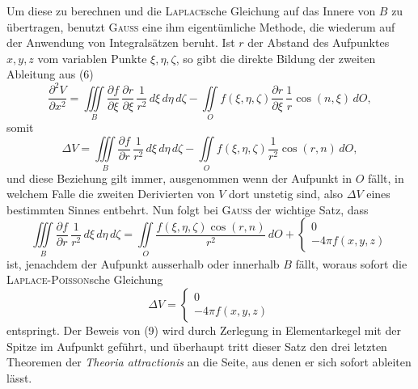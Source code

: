Um diese zu berechnen und die \textsc{Laplace}sche Gleichung auf das Innere
von \(B\) zu übertragen, benutzt \textsc{Gauss} eine ihm eigentümliche Methode, die
wiederum auf der Anwendung von Integralsätzen beruht. Ist \(r\) der Abstand
des Aufpunktes \(x,y,z\) vom variablen Punkte \(\xi,\eta,\zeta\), so gibt die direkte Bildung
der zweiten Ableitung aus (6)
\begingroup\small
\[
\frac{\partial^2V}{\partial x^2}
=\iiint\limits_B\frac{\partial f}{\partial\xi}\,\frac{\partial r}{\partial\xi}\,\frac1{r^2}\,d\xi\,d\eta\,d\zeta
-\iint\limits_O f(\xi,\eta,\zeta)\frac{\partial r}{\partial\xi}\,\frac1r\cos(n,\xi)\,dO,\tag{7}
\]
\endgroup
\noindent somit
\[
\Delta V=\iiint\limits_B\frac{\partial f}{\partial r}\,\frac1{r^2}\,d\xi\,d\eta\,d\zeta
-\iint\limits_O f(\xi,\eta,\zeta)\frac1{r^2}\cos(r,n)\,dO,\tag{8}
\]
\noindent und diese Beziehung gilt immer, ausgenommen wenn der Aufpunkt in \(O\) fällt,
in welchem Falle die zweiten Derivierten von \(V\) dort unstetig sind, also \(\Delta V\)
eines bestimmten Sinnes entbehrt. Nun folgt bei \textsc{Gauss} der wichtige Satz,
dass
\begingroup\small
\[
\iiint\limits_B\frac{\partial f}{\partial r}\,\frac1{r^2}\,d\xi\,d\eta\,d\zeta
=\iint\limits_O\frac{f(\xi,\eta,\zeta)\cos(r,n)}{r^2}\,dO
+\left\{\begin{array}{l}0\\-4\pi f(x,y,z)\end{array}\right.\tag{9}
\]
\endgroup
\noindent ist, jenachdem der Aufpunkt ausserhalb oder innerhalb \(B\) fällt, woraus sofort
die \textsc{Laplace-Poisson}sche Gleichung
\[
\Delta V=\left\{\begin{array}{l}0\\-4\pi f(x,y,z)\end{array}\right.\tag{10}
\]
\noindent entspringt. Der Beweis von (9) wird durch Zerlegung in Elementarkegel mit
der Spitze im Aufpunkt geführt, und überhaupt tritt dieser Satz den drei
letzten Theoremen der \textit{Theoria attractionis} an die Seite, aus denen er sich
sofort ableiten lässt.


